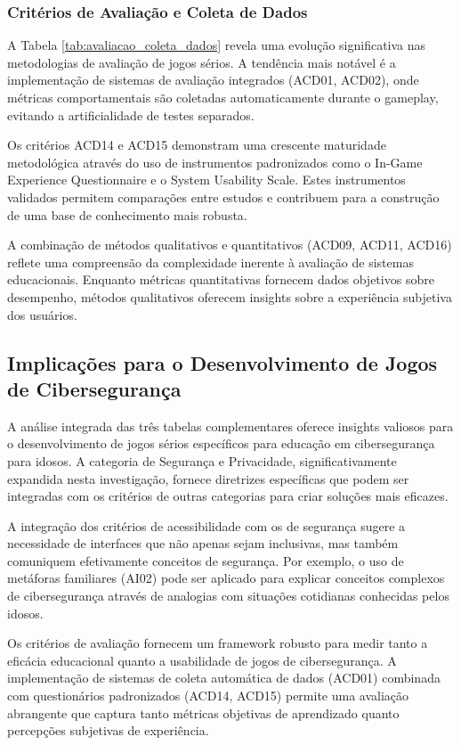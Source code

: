 \begin{table}[H]
\subsubsection{Critérios de Avaliação e Coleta de Dados}
\label{subsubsec:analise_avaliacao}

A Tabela \ref{tab:avaliacao_coleta_dados} revela uma evolução significativa nas metodologias de avaliação de jogos sérios. A tendência mais notável é a implementação de sistemas de avaliação integrados (ACD01, ACD02), onde métricas comportamentais são coletadas automaticamente durante o gameplay, evitando a artificialidade de testes separados.

Os critérios ACD14 e ACD15 demonstram uma crescente maturidade metodológica através do uso de instrumentos padronizados como o In-Game Experience Questionnaire e o System Usability Scale. Estes instrumentos validados permitem comparações entre estudos e contribuem para a construção de uma base de conhecimento mais robusta.

A combinação de métodos qualitativos e quantitativos (ACD09, ACD11, ACD16) reflete uma compreensão da complexidade inerente à avaliação de sistemas educacionais. Enquanto métricas quantitativas fornecem dados objetivos sobre desempenho, métodos qualitativos oferecem insights sobre a experiência subjetiva dos usuários.

\subsection{Implicações para o Desenvolvimento de Jogos de Cibersegurança}
\label{subsec:implicacoes_desenvolvimento}

A análise integrada das três tabelas complementares oferece insights valiosos para o desenvolvimento de jogos sérios específicos para educação em cibersegurança para idosos. A categoria de Segurança e Privacidade, significativamente expandida nesta investigação, fornece diretrizes específicas que podem ser integradas com os critérios de outras categorias para criar soluções mais eficazes.

A integração dos critérios de acessibilidade com os de segurança sugere a necessidade de interfaces que não apenas sejam inclusivas, mas também comuniquem efetivamente conceitos de segurança. Por exemplo, o uso de metáforas familiares (AI02) pode ser aplicado para explicar conceitos complexos de cibersegurança através de analogias com situações cotidianas conhecidas pelos idosos.

Os critérios de avaliação fornecem um framework robusto para medir tanto a eficácia educacional quanto a usabilidade de jogos de cibersegurança. A implementação de sistemas de coleta automática de dados (ACD01) combinada com questionários padronizados (ACD14, ACD15) permite uma avaliação abrangente que captura tanto métricas objetivas de aprendizado quanto percepções subjetivas de experiência.


\end{table}
